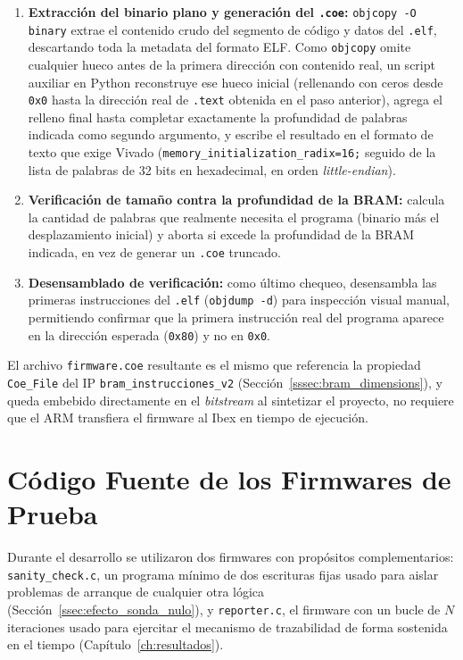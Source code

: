 \begin{enumerate}
    \item \textbf{Extracción del binario plano y generación del
    \texttt{.coe}:} \texttt{objcopy -O binary} extrae el contenido crudo
    del segmento de código y datos del \texttt{.elf}, descartando toda la
    metadata del formato ELF. Como \texttt{objcopy} omite cualquier hueco
    antes de la primera dirección con contenido real, un script auxiliar
    en Python reconstruye ese hueco inicial (rellenando con ceros desde
    \texttt{0x0} hasta la dirección real de \texttt{.text} obtenida en el
    paso anterior), agrega el relleno final hasta completar exactamente
    la profundidad de palabras indicada como segundo argumento, y escribe
    el resultado en el formato de texto que exige Vivado
    (\texttt{memory\_initialization\_radix=16;} seguido de la lista de
    palabras de 32 bits en hexadecimal, en orden \textit{little-endian}).

    \item \textbf{Verificación de tamaño contra la profundidad de la
    BRAM:} calcula la cantidad de palabras que realmente necesita el
    programa (binario más el desplazamiento inicial) y aborta si excede
    la profundidad de la BRAM indicada, en vez de generar un
    \texttt{.coe} truncado.

    \item \textbf{Desensamblado de verificación:} como último chequeo, desensambla las primeras instrucciones del \texttt{.elf}
    (\texttt{objdump -d}) para inspección visual manual, permitiendo
    confirmar que la primera instrucción real del programa aparece en la
    dirección esperada (\texttt{0x80}) y no en \texttt{0x0}.
\end{enumerate}

El archivo \texttt{firmware.coe} resultante es el mismo que referencia la
propiedad \texttt{Coe\_File} del IP \texttt{bram\_instrucciones\_v2}
(Sección~\ref{sssec:bram_dimensions}), y queda embebido directamente en el
\textit{bitstream} al sintetizar el proyecto, no requiere que el ARM
transfiera el firmware al Ibex en tiempo de ejecución. 

\section{Código Fuente de los Firmwares de Prueba}
\label{sec:codigo_firmwares}

Durante el desarrollo se utilizaron dos firmwares con propósitos
complementarios: \texttt{sanity\_check.c}, un programa mínimo de dos
escrituras fijas usado para aislar problemas de arranque de cualquier
otra lógica (Sección~\ref{ssec:efecto_sonda_nulo}), y \texttt{reporter.c},
el firmware con un bucle de $N$ iteraciones usado para ejercitar el
mecanismo de trazabilidad de forma sostenida en el tiempo
(Capítulo~\ref{ch:resultados}).

